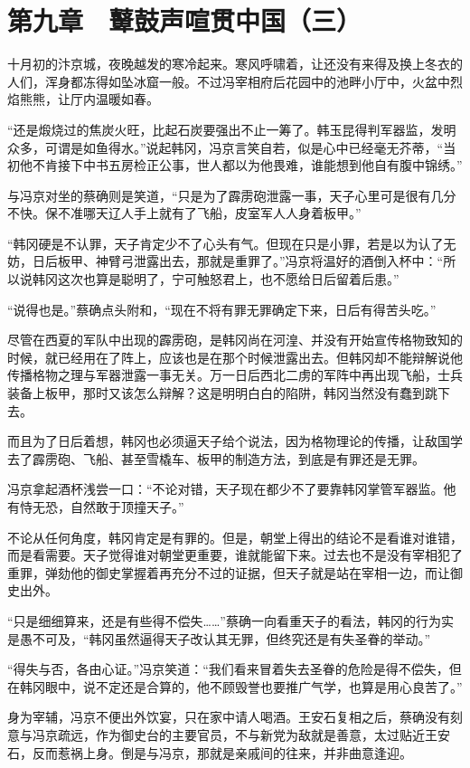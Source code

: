 \section{第九章　鼙鼓声喧贯中国（三）}

十月初的汴京城，夜晚越发的寒冷起来。寒风呼啸着，让还没有来得及换上冬衣的人们，浑身都冻得如坠冰窟一般。不过冯宰相府后花园中的池畔小厅中，火盆中烈焰熊熊，让厅内温暖如春。

“还是煅烧过的焦炭火旺，比起石炭要强出不止一筹了。韩玉昆得判军器监，发明众多，可谓是如鱼得水。”说起韩冈，冯京言笑自若，似是心中已经毫无芥蒂，“当初他不肯接下中书五房检正公事，世人都以为他畏难，谁能想到他自有腹中锦绣。”

与冯京对坐的蔡确则是笑道，“只是为了霹雳砲泄露一事，天子心里可是很有几分不快。保不准哪天辽人手上就有了飞船，皮室军人人身着板甲。”

“韩冈硬是不认罪，天子肯定少不了心头有气。但现在只是小罪，若是以为认了无妨，日后板甲、神臂弓泄露出去，那就是重罪了。”冯京将温好的酒倒入杯中：“所以说韩冈这次也算是聪明了，宁可触怒君上，也不愿给日后留着后患。”

“说得也是。”蔡确点头附和，“现在不将有罪无罪确定下来，日后有得苦头吃。”

尽管在西夏的军队中出现的霹雳砲，是韩冈尚在河湟、并没有开始宣传格物致知的时候，就已经用在了阵上，应该也是在那个时候泄露出去。但韩冈却不能辩解说他传播格物之理与军器泄露一事无关。万一日后西北二虏的军阵中再出现飞船，士兵装备上板甲，那时又该怎么辩解？这是明明白白的陷阱，韩冈当然没有蠢到跳下去。

而且为了日后着想，韩冈也必须逼天子给个说法，因为格物理论的传播，让敌国学去了霹雳砲、飞船、甚至雪橇车、板甲的制造方法，到底是有罪还是无罪。

冯京拿起酒杯浅尝一口：“不论对错，天子现在都少不了要靠韩冈掌管军器监。他有恃无恐，自然敢于顶撞天子。”

不论从任何角度，韩冈肯定是有罪的。但是，朝堂上得出的结论不是看谁对谁错，而是看需要。天子觉得谁对朝堂更重要，谁就能留下来。过去也不是没有宰相犯了重罪，弹劾他的御史掌握着再充分不过的证据，但天子就是站在宰相一边，而让御史出外。

“只是细细算来，还是有些得不偿失……”蔡确一向看重天子的看法，韩冈的行为实是愚不可及，“韩冈虽然逼得天子改认其无罪，但终究还是有失圣眷的举动。”

“得失与否，各由心证。”冯京笑道：“我们看来冒着失去圣眷的危险是得不偿失，但在韩冈眼中，说不定还是合算的，他不顾毁誉也要推广气学，也算是用心良苦了。”

身为宰辅，冯京不便出外饮宴，只在家中请人喝酒。王安石复相之后，蔡确没有刻意与冯京疏远，作为御史台的主要官员，不与新党为敌就是善意，太过贴近王安石，反而惹祸上身。倒是与冯京，那就是亲戚间的往来，并非曲意逢迎。

